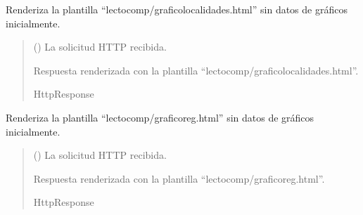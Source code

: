 \documentclass[letterpaper,10pt,spanish]{sphinxmanual}
\begin{document}
\begin{fulllineitems}

\pysigstartsignatures
{}
\pysigstopsignatures
\sphinxAtStartPar
Renderiza la plantilla “lectocomp/graficolocalidades.html” sin datos de gráficos inicialmente.
\begin{quote}\begin{description}
\sphinxAtStartPar
{} () \textendash{} La solicitud HTTP recibida.

\sphinxAtStartPar
Respuesta renderizada con la plantilla “lectocomp/graficolocalidades.html”.

\sphinxAtStartPar
HttpResponse

\end{description}\end{quote}

\end{fulllineitems}



\begin{fulllineitems}

\pysigstartsignatures
{}
\pysigstopsignatures
\sphinxAtStartPar
Renderiza la plantilla “lectocomp/graficoreg.html” sin datos de gráficos inicialmente.
\begin{quote}\begin{description}
\sphinxAtStartPar
{} () \textendash{} La solicitud HTTP recibida.

\sphinxAtStartPar
Respuesta renderizada con la plantilla “lectocomp/graficoreg.html”.

\sphinxAtStartPar
HttpResponse

\end{description}\end{quote}

\end{fulllineitems}
\end{document}
